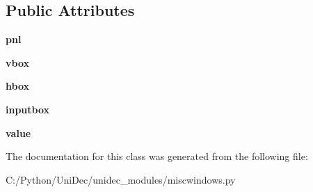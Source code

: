 \subsection*{Public Attributes}
\begin{DoxyCompactItemize}
\item 
\hypertarget{class_uni_dec_1_1unidec__modules_1_1miscwindows_1_1_single_input_dialog_a74c349287702e3c3f6838124f419faac}{}{\bfseries pnl}\label{class_uni_dec_1_1unidec__modules_1_1miscwindows_1_1_single_input_dialog_a74c349287702e3c3f6838124f419faac}

\item 
\hypertarget{class_uni_dec_1_1unidec__modules_1_1miscwindows_1_1_single_input_dialog_a44bb6dd6f29bdf3da88e5fbcb86a8a8a}{}{\bfseries vbox}\label{class_uni_dec_1_1unidec__modules_1_1miscwindows_1_1_single_input_dialog_a44bb6dd6f29bdf3da88e5fbcb86a8a8a}

\item 
\hypertarget{class_uni_dec_1_1unidec__modules_1_1miscwindows_1_1_single_input_dialog_a37581a78d1a9e2738d0fc4f01b9f45a7}{}{\bfseries hbox}\label{class_uni_dec_1_1unidec__modules_1_1miscwindows_1_1_single_input_dialog_a37581a78d1a9e2738d0fc4f01b9f45a7}

\item 
\hypertarget{class_uni_dec_1_1unidec__modules_1_1miscwindows_1_1_single_input_dialog_a8107fecdad52394036b5a35c7a7ba18e}{}{\bfseries inputbox}\label{class_uni_dec_1_1unidec__modules_1_1miscwindows_1_1_single_input_dialog_a8107fecdad52394036b5a35c7a7ba18e}

\item 
\hypertarget{class_uni_dec_1_1unidec__modules_1_1miscwindows_1_1_single_input_dialog_ac1f7ab7d4e2275b67387e0a83d02694a}{}{\bfseries value}\label{class_uni_dec_1_1unidec__modules_1_1miscwindows_1_1_single_input_dialog_ac1f7ab7d4e2275b67387e0a83d02694a}

\end{DoxyCompactItemize}


The documentation for this class was generated from the following file\+:\begin{DoxyCompactItemize}
\item 
C\+:/\+Python/\+Uni\+Dec/unidec\+\_\+modules/miscwindows.\+py\end{DoxyCompactItemize}
